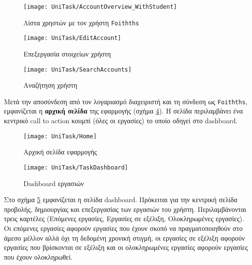         \begin{figure}[h!] \noindent \centering
            \texttt{[image: UniTask/AccountOverview\_WithStudent]}
            \caption{\centering Λίστα χρηστών με τον χρήστη \texttt{Foithths}}
            \label{fig:unitask_AccountOverview_WithStudent}
        \end{figure}

        \begin{figure}[h!] \noindent \centering
            \texttt{[image: UniTask/EditAccount]}
            \caption{\centering Επεξεργασία στοιχείων χρήστη}
            \label{fig:unitask_EditAccount}
        \end{figure}

        \begin{figure}[h!] \noindent \centering
            \texttt{[image: UniTask/SearchAccounts]}
            \caption{\centering Αναζήτηση χρήστη}
            \label{fig:unitask_SearchAccounts}
        \end{figure}

        Μετά την αποσύνδεση από τον λογαριασμό διαχειριστή και τη σύνδεση ως \texttt{Foithths}, εμφανίζεται η \textbf{αρχική σελίδα} της εφαρμογής (σχήμα \ref{fig:unitask_Home}). Η σελίδα περιλαμβάνει ένα κεντρικό call to action κουμπί ({\Zona όλες οι εργασίες}) το οποίο οδηγεί στο {\Zona dashboard}.

        \begin{figure}[h!] \noindent \centering
            \texttt{[image: UniTask/Home]}
            \caption{\centering Αρχική σελίδα εφαρμογής}
            \label{fig:unitask_Home}
        \end{figure}

        \begin{figure}[h!] \noindent \centering
            \texttt{[image: UniTask/TaskDashboard]}
            \caption{\centering Dashboard εργασιών}
            \label{fig:unitask_TaskDashboard}
        \end{figure}

        Στο σχήμα \ref{fig:unitask_TaskDashboard} εμφανίζεται η σελίδα {\ZonaSB dashboard}. Πρόκειται για την κεντρική σελίδα προβολής, δημιουργίας και επεξεργασίας των εργασιών του χρήστη. Περιλαμβάνονται τρεις καρτέλες ({\Zona Επόμενες εργασίες}, {\Zona Εργασίες σε εξέλιξη}, {\Zona Ολοκληρωμένες εργασίες}). Οι επόμενες εργασίες αφορούν εργασίες που έχουν σκοπό να πραγματοποιηθούν στο άμεσο μέλλον αλλά όχι τη δεδομένη χρονική στιγμή, οι εργασίες σε εξέλιξη αφορούν εργασίες που βρίσκονται σε εξέλιξη και οι ολοκληρωμένες εργασίες αφορούν εργασίες που έχουν ολοκληρωθεί.

